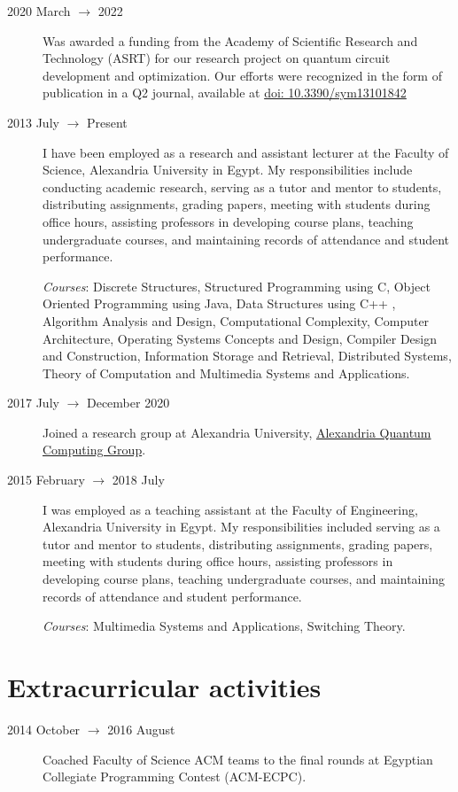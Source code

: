 \documentclass[margin,line]{resume}
\newcommand*{\doi}[1]{\href{http://dx.doi.org/#1}{doi: #1}}
\begin{document}
\begin{resume}
\begin{description}
    \item[2020 March $\rightarrow$ 2022] Was awarded a funding from the Academy of Scientific Research and Technology (ASRT) for our research project on quantum circuit development and optimization. Our efforts were recognized in the form of publication in a Q2 journal, available at \doi{10.3390/sym13101842}

    
    \item[2013 July $\rightarrow$ Present]  I have been employed as a research and assistant lecturer at the Faculty of Science, Alexandria University in Egypt. My responsibilities include conducting academic research, serving as a tutor and mentor to students, distributing assignments, grading papers, meeting with students during office hours, assisting professors in developing course plans, teaching undergraduate courses, and maintaining records of attendance and student performance.
       
    \emph{Courses}: Discrete Structures, Structured Programming using C, Object Oriented Programming using Java, Data Structures using C++ , Algorithm Analysis and Design, Computational Complexity, Computer Architecture, Operating Systems Concepts and Design, Compiler Design and Construction, Information Storage and Retrieval, Distributed Systems, Theory of Computation and Multimedia Systems and Applications.
    
        
	\item[2017 July $\rightarrow$ December 2020 ]  Joined a research group at Alexandria University, \href{http://www.sci.p.alexu.edu.eg/~aleqcg/index.html}{Alexandria Quantum Computing Group}.
    

        

	\item[2015 February $\rightarrow$ 2018 July]  I was employed as a teaching assistant at the Faculty of Engineering, Alexandria University in Egypt. My responsibilities included serving as a tutor and mentor to students, distributing assignments, grading papers, meeting with students during office hours, assisting professors in developing course plans, teaching undergraduate courses, and maintaining records of attendance and student performance.
    
	\emph{Courses}: Multimedia Systems and Applications, Switching Theory.
    
\end{description}



\section{\mysidestyle Extracurricular activities}\vspace{1mm}
    \begin{description}
    \item[2014 October $\rightarrow$ 2016 August] Coached Faculty of Science ACM teams to the final rounds at Egyptian Collegiate Programming Contest (ACM-ECPC).


\end{description}
\end{resume}
\end{document}
